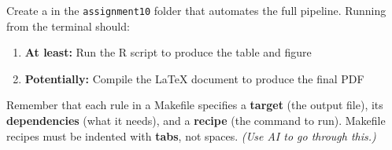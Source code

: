 Create a  in the \texttt{assignment10} folder that automates the full pipeline. Running  from the terminal should:

\begin{enumerate}[label=\arabic*.]
  \item \textbf{At least:} Run the R script to produce the table and figure
  \item \textbf{Potentially:} Compile the \LaTeX{} document to produce the final PDF
\end{enumerate}

Remember that each rule in a Makefile specifies a \textbf{target} (the output file), its \textbf{dependencies} (what it needs), and a \textbf{recipe} (the command to run). Makefile recipes must be indented with \textbf{tabs}, not spaces. \textit{(Use AI to go through this.)}

\vspace{15pt}





